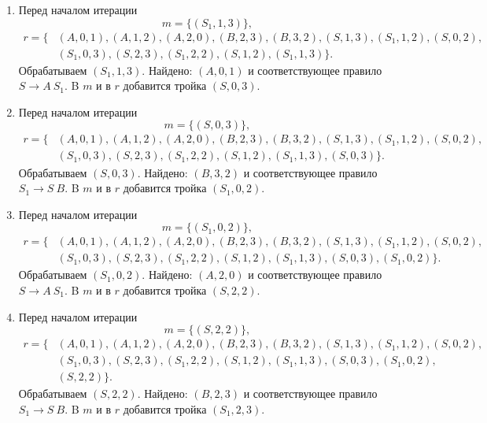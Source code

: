 \begin{example}
\begin{enumerate}
   \item
   Перед началом итерации
     $$
     m = \{(S_1, 1, 3)\},
     $$
     \begin{align*}
     r= \{&(A,0,1),(A,1,2),(A,2,0),(B,2,3),(B,3,2),(S,1,3),(S_1, 1, 2),(S, 0, 2),\\
          &(S_1, 0, 3),(S, 2, 3),(S_1, 2, 2),(S, 1, 2),(S_1, 1, 3)\}.
     \end{align*}
     Обрабатываем $(S_1, 1, 3)$.
     Найдено: $(A,0,1)$ и соответствующее правило $S \to A \ S_1$.
     B $m$ и в $r$ добавится тройка $(S, 0, 3)$.

   \item
   Перед началом итерации
     $$
     m = \{(S, 0, 3)\},
     $$
     \begin{align*}
     r= \{&(A,0,1),(A,1,2),(A,2,0),(B,2,3),(B,3,2),(S,1,3),(S_1, 1, 2),(S, 0, 2),\\
          &(S_1, 0, 3),(S, 2, 3),(S_1, 2, 2),(S, 1, 2),(S_1, 1, 3),(S, 0, 3)\}.
     \end{align*}
     Обрабатываем $(S, 0, 3)$.
     Найдено: $(B,3,2)$ и соответствующее правило $S_1 \to S \ B$.
     B $m$ и в $r$ добавится тройка $(S_1, 0, 2)$.

   \item
   Перед началом итерации
     $$
     m = \{(S_1, 0, 2)\},
     $$
     \begin{align*}
     r= \{&(A,0,1),(A,1,2),(A,2,0),(B,2,3),(B,3,2),(S,1,3),(S_1, 1, 2),(S, 0, 2),\\
          &(S_1, 0, 3),(S, 2, 3),(S_1, 2, 2),(S, 1, 2),(S_1, 1, 3),(S, 0, 3),(S_1, 0, 2)\}.
     \end{align*}
     Обрабатываем $(S_1, 0, 2)$.
     Найдено: $(A,2,0)$ и соответствующее правило $S \to A \ S_1$.
     B $m$ и в $r$ добавится тройка $(S, 2, 2)$.

   \item
   Перед началом итерации
     $$
     m = \{(S, 2, 2)\},
     $$
     \begin{align*}
     r= \{&(A,0,1),(A,1,2),(A,2,0),(B,2,3),(B,3,2),(S,1,3),(S_1, 1, 2),(S, 0, 2),\\
          &(S_1, 0, 3),(S, 2, 3),(S_1, 2, 2),(S, 1, 2),(S_1, 1, 3),(S, 0, 3),(S_1, 0, 2),\\
          &(S, 2, 2)\}.
     \end{align*}
     Обрабатываем $(S, 2, 2)$.
     Найдено: $(B,2,3)$ и соответствующее правило $S_1 \to S \ B$.
     B $m$ и в $r$ добавится тройка $(S_1, 2, 3)$.


\end{enumerate}
\end{example}
